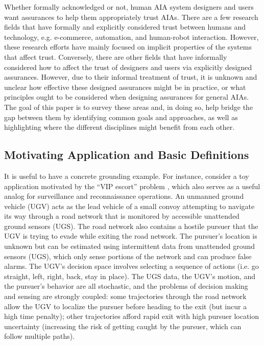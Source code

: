     Whether formally acknowledged or not, human AIA system designers and users want assurances to help them appropriately trust AIAs. There are a few research fields that have formally and explicitly considered trust between humans and technology, e.g. e-commerce, automation, and human-robot interaction. However, these research efforts have mainly focused on implicit properties of the systems that affect trust. Conversely, there are other fields that have informally considered how to affect the trust of designers and users via explicitly designed assurances. However, due to their informal treatment of trust, it is unknown and unclear how effective these designed assurances might be in practice, or what principles ought to be considered when designing assurances for general AIAs. The goal of this paper is to survey these areas and, in doing so, help bridge the gap between them by identifying common goals and approaches, as well as highlighting where the different disciplines might benefit from each other.

\subsection{Motivating Application and Basic Definitions} \label{sec:mot_example}
    It is useful to have a concrete grounding example. %
    For instance, consider a toy application motivated by the ``VIP escort'' problem \cite{Humphrey2012-lr}, which also serves as a useful analog for surveillance and reconnaissance operations.  An unmanned ground vehicle (UGV) acts as the lead vehicle of a small convoy attempting to navigate its way through a road network that is monitored by accessible unattended ground sensors (UGS). The road network also contains a hostile pursuer that the UGV is trying to evade while exiting the road network. %
The pursuer's location is unknown but can be estimated using intermittent data from unattended ground sensors (UGS), which only sense portions of the network and can produce false alarms. The UGV's decision space involves selecting a sequence of actions (i.e. go straight, left, right, back, stay in place). The UGS data, the UGV's motion, and the pursuer's behavior are all stochastic, and the problems of decision making and sensing are strongly coupled: some trajectories through the road network allow the UGV to localize the pursuer before heading to the exit (but incur a high time penalty); other trajectories afford rapid exit with high pursuer location uncertainty (increasing the risk of getting caught by the pursuer, which can follow multiple paths). 

